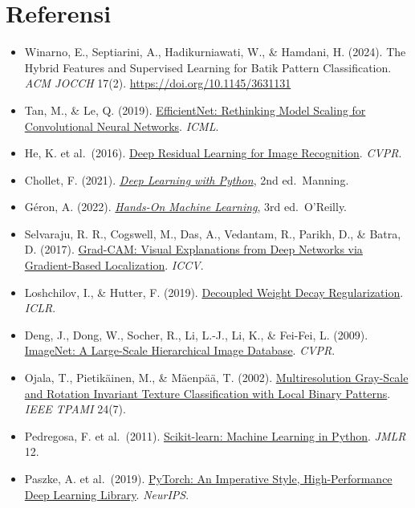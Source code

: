 \documentclass[10pt,a4paper]{article}
\providecommand{\tightlist}{\setlength{\itemsep}{2pt}\setlength{\parskip}{0pt}}
\begin{document}
\section*{Referensi}\label{referensi}

{\small
\begin{itemize}[parsep=0pt,topsep=0pt]
\tightlist
\item
  Winarno, E., Septiarini, A., Hadikurniawati, W., \& Hamdani, H. (2024). The Hybrid Features and Supervised Learning for Batik Pattern Classification. \emph{ACM JOCCH} 17(2). \url{https://doi.org/10.1145/3631131}
\item
  Tan, M., \& Le, Q. (2019). \href{https://proceedings.mlr.press/v97/tan19a.html}{EfficientNet: Rethinking Model Scaling for Convolutional Neural Networks}. \emph{ICML}.
\item
  He, K. et al.~(2016). \href{https://doi.org/10.1109/CVPR.2016.90}{Deep Residual Learning for Image Recognition}. \emph{CVPR}.
\item
  Chollet, F. (2021). \href{https://www.manning.com/books/deep-learning-with-python-second-edition}{\emph{Deep Learning with Python}}, 2nd ed.~Manning.
\item
  Géron, A. (2022). \href{https://openlibrary.org/isbn/9781098125974}{\emph{Hands-On Machine Learning}}, 3rd ed.~O'Reilly.
\item
  Selvaraju, R. R., Cogswell, M., Das, A., Vedantam, R., Parikh, D., \& Batra, D. (2017). \href{https://doi.org/10.1109/ICCV.2017.74}{Grad-CAM: Visual Explanations from Deep Networks via Gradient-Based Localization}. \emph{ICCV}.
\item
  Loshchilov, I., \& Hutter, F. (2019). \href{https://arxiv.org/abs/1711.05101}{Decoupled Weight Decay Regularization}. \emph{ICLR}.
\item
  Deng, J., Dong, W., Socher, R., Li, L.-J., Li, K., \& Fei-Fei, L. (2009). \href{https://doi.org/10.1109/CVPR.2009.5206848}{ImageNet: A Large-Scale Hierarchical Image Database}. \emph{CVPR}.
\item
  Ojala, T., Pietikäinen, M., \& Mäenpää, T. (2002). \href{https://doi.org/10.1109/TPAMI.2002.1017623}{Multiresolution Gray-Scale and Rotation Invariant Texture Classification with Local Binary Patterns}. \emph{IEEE TPAMI} 24(7).
\item
  Pedregosa, F. et al.~(2011). \href{https://jmlr.org/papers/v12/pedregosa11a.html}{Scikit-learn: Machine Learning in Python}. \emph{JMLR} 12.
\item
  Paszke, A. et al.~(2019). \href{https://proceedings.neurips.cc/paper/2019/hash/bdbca288fee7f92f2bfa9f7012727740-Abstract.html}{PyTorch: An Imperative Style, High-Performance Deep Learning Library}. \emph{NeurIPS}.
\end{itemize}
}
\end{document}
